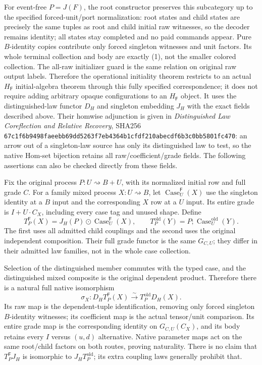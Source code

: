 \documentclass[11pt]{article}
\begin{document}
For event-free $P=J(F)$, the root constructor preserves this subcategory up to the specified forced-unit/port normalization: root states and child states are precisely the same tuples as root and child initial raw witnesses, so the decoder remains identity; all states stay completed and no paid commands appear. Pure $B$-identity copies contribute only forced singleton witnesses and unit factors. Its whole terminal collection and body are exactly (1), not the smaller colored collection. The all-raw initializer guard is the same relation on original raw output labels. Therefore the operational initiality theorem restricts to an actual $H_{\mathsf F}$ initial-algebra theorem through this fully specified correspondence; it does not require adding arbitrary opaque configurations to an $H_{\mathsf F}$ object. It uses the distinguished-law functor $D_H$ and singleton embedding $J_H$ with the exact fields described above. Their homwise adjunction is given in \emph{Distinguished Law Coreflection and Relative Recovery}, SHA256 \texttt{67c1f6b9498faeebb69dd5263f7eb4364b1cfdf210abecdf6b3c0bb5801fc470}: an arrow out of a singleton-law source has only its distinguished law to test, so the native Hom-set bijection retains all raw/coefficient/grade fields. The following assertions can also be checked directly from these fields.

Fix the original process $P:U\rightsquigarrow B+U$, with its normalized initial row and full grade $C$. For a family mixed process $X:U\rightsquigarrow B$, let $\operatorname{Case}_U^{\mathsf F}(X)$ use the singleton identity at a $B$ input and the corresponding $X$ row at a $U$ input. Its entire grade is $I+U\cdot C_X$, including every case tag and unused shape. Define
\[
 T_P^{\mathsf F}(X)=J_H(P)\odot\operatorname{Case}_U^{\mathsf F}(X),\qquad
 T_P^{\mathrm{old}}(Y)=P;\operatorname{Case}_U^{\mathrm{old}}(Y).
\]
The first uses all admitted child couplings and the second uses the original independent composition. Their full grade functor is the same $G_{C,U}$; they differ in their admitted law families, not in the whole case collection.

Selection of the distinguished member commutes with the typed case, and the distinguished mixed composite is the original dependent product. Therefore there is a natural full native isomorphism
\[
 \sigma_X:D_H T_P^{\mathsf F}(X)\xrightarrow{\sim}
                  T_P^{\mathrm{old}}D_H(X).             \tag{3}
\]
Its raw map is the dependent-tuple identification, removing only forced singleton $B$-identity witnesses; its coefficient map is the actual tensor/unit comparison. Its entire grade map is the corresponding identity on $G_{C,U}(C_X)$, and its body retains every $I$ versus $(u,d)$ alternative. Native parameter maps act on the same root/child factors on both routes, proving naturality. There is no claim that $T_P^{\mathsf F}J_H$ is isomorphic to $J_HT_P^{\mathrm{old}}$; its extra coupling laws generally prohibit that.
\end{document}
